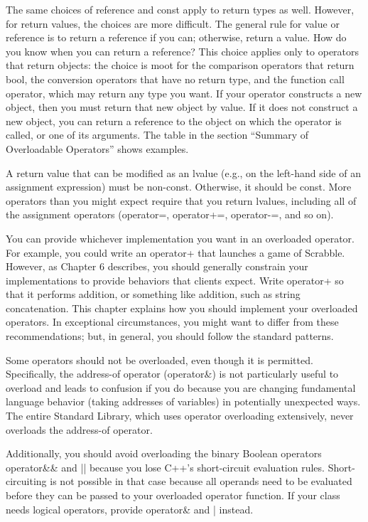 The same choices of reference and const apply to return types as well. However, for return values, the choices are more difficult. The general rule for value or reference is to return a reference if you can; otherwise, return a value. How do you know when you can return a reference? This choice applies only to operators that return objects: the choice is moot for the comparison operators that return bool, the conversion operators that have no return type, and the function call operator, which may return any type you want. If your operator constructs a new object, then you must return that new object by value. If it does not construct a new object, you can return a reference to the object on which the operator is called, or one of its arguments. The table in the section “Summary of Overloadable Operators” shows examples.

A return value that can be modified as an lvalue (e.g., on the left-hand side of an assignment expression) must be non-const. Otherwise, it should be const. More operators than you might expect require that you return lvalues, including all of the assignment operators (operator=, operator+=, operator-=, and so on).


You can provide whichever implementation you want in an overloaded operator. For example, you could write an operator+ that launches a game of Scrabble. However, as Chapter 6 describes, you should generally constrain your implementations to provide behaviors that clients expect. Write operator+ so that it performs addition, or something like addition, such as string concatenation. This chapter explains how you should implement your overloaded operators. In exceptional circumstances, you might want to differ from these recommendations; but, in general, you should follow the standard patterns.


Some operators should not be overloaded, even though it is permitted. Specifically, the address-of operator (operator\&) is not particularly useful to overload and leads to confusion if you do because you are changing fundamental language behavior (taking addresses of variables) in potentially unexpected ways. The entire Standard Library, which uses operator overloading extensively, never overloads the address-of operator.

Additionally, you should avoid overloading the binary Boolean operators operator\&\& and || because you lose C++’s short-circuit evaluation rules. Short-circuiting is not possible in that case because all operands need to be evaluated before they can be passed to your overloaded operator function. If your class needs logical operators, provide operator\& and | instead.


